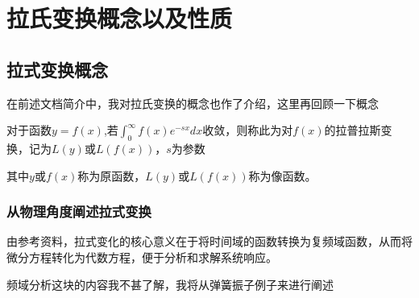 \thispagestyle{fancy}
\chapter{拉氏变换概念以及性质}
\section{拉式变换概念}

在前述文档简介中，我对拉氏变换的概念也作了介绍，这里再回顾一下概念

\hspace{0.5em} 对于函数$y=f(x)$,若$\int_{0}^{\infty}f\left(x\right)e^{-sx}dx$收敛，则称此为对$f(x)$的拉普拉斯变换，记为$L(y)$或$L(f(x))$，$s$为参数

其中$y$或$f(x)$称为原函数，$L(y)$或$L(f(x))$称为像函数。

\subsection*{从物理角度阐述拉式变换}

由参考资料，拉式变化的核心意义在于将时间域的函数转换为复频域函数，从而将微分方程转化为代数方程，便于分析和求解系统响应。

频域分析这块的内容我不甚了解，我将从弹簧振子例子来进行阐述


